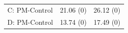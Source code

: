 \documentclass[11pt,]{article}
\begin{document}
\begin{longtable}[]{@{}lrr@{}}
\begin{minipage}[t]{0.18\columnwidth}\raggedright\strut
C: PM-Control\strut
\end{minipage} & \begin{minipage}[t]{0.14\columnwidth}\raggedleft\strut
21.06 (0)\strut
\end{minipage} & \begin{minipage}[t]{0.16\columnwidth}\raggedleft\strut
26.12 (0)\strut
\end{minipage}\tabularnewline
\begin{minipage}[t]{0.18\columnwidth}\raggedright\strut
D: PM-Control\strut
\end{minipage} & \begin{minipage}[t]{0.14\columnwidth}\raggedleft\strut
13.74 (0)\strut
\end{minipage} & \begin{minipage}[t]{0.16\columnwidth}\raggedleft\strut
17.49 (0)\strut
\end{minipage}\tabularnewline
\bottomrule
\end{longtable}
\end{document}
